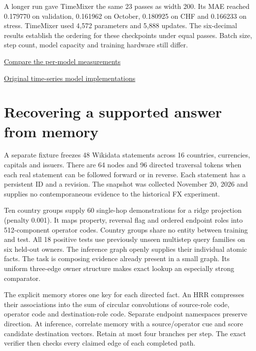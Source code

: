 \documentclass[11pt,oneside,openany]{book}
\begin{document}
A longer run gave TimeMixer the same 23 passes as width 200. Its MAE reached 0.179770 on validation, 0.161962 on October, 0.180925 on CHF and 0.166233 on stress. TimeMixer used 4,572 parameters and 5,888 updates. The six-decimal results establish the ordering for these checkpoints under equal passes. Batch size, step count, model capacity and training hardware still differ.

{\small\sffamily\href{https://amelie-iska.github.io/phaseweave-lab/results.html}{Compare the per-model measurements}\par}
{\small\sffamily\href{https://github.com/thuml/Time-Series-Library/tree/4e938a1767106324dd753b2a44832bf870a0252e}{Original time-series model implementations}\par}
\section*{Recovering a supported answer from memory}
A separate fixture freezes 48 Wikidata statements across 16 countries, currencies, capitals and issuers. There are 64 nodes and 96 directed traversal tokens when each real statement can be followed forward or in reverse. Each statement has a persistent ID and a revision. The snapshot was collected November 20, 2026 and supplies no contemporaneous evidence to the historical FX experiment.

Ten country groups supply 60 single-hop demonstrations for a ridge projection (penalty 0.001). It maps property, reversal flag and ordered endpoint roles into 512-component operator codes. Country groups share no entity between training and test. All 18 positive tests use previously unseen multistep query families on six held-out owners. The inference graph openly supplies their individual atomic facts. The task is composing evidence already present in a small graph. Its uniform three-edge owner structure makes exact lookup an especially strong comparator.

The explicit memory stores one key for each directed fact. An HRR compresses their associations into the sum of circular convolutions of source-role code, operator code and destination-role code. Separate endpoint namespaces preserve direction. At inference, correlate memory with a source/operator cue and score candidate destination vectors. Retain at most four branches per step. The exact verifier then checks every claimed edge of each completed path.
\end{document}
